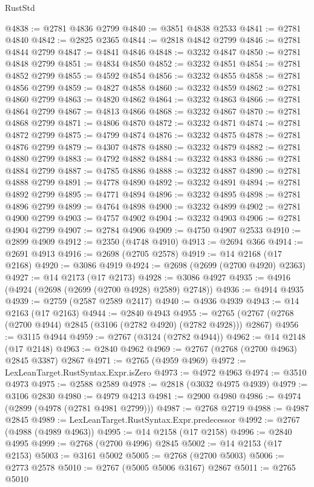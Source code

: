 \begin{lexlean}{RustStd}
\begin{coremodule}
@4838 := @2781 @4836 @2799
@4840 := @3851 @4838 @2533
@4841 := @2781 @4840
@4842 := @2825 @2365
@4844 := @2818 @4842 @2799
@4846 := @2781 @4844 @2799
@4847 := @4841 @4846
@4848 := @3232 @4847
@4850 := @2781 @4848 @2799
@4851 := @4834 @4850
@4852 := @3232 @4851
@4854 := @2781 @4852 @2799
@4855 := @4592 @4854
@4856 := @3232 @4855
@4858 := @2781 @4856 @2799
@4859 := @4827 @4858
@4860 := @3232 @4859
@4862 := @2781 @4860 @2799
@4863 := @4820 @4862
@4864 := @3232 @4863
@4866 := @2781 @4864 @2799
@4867 := @4813 @4866
@4868 := @3232 @4867
@4870 := @2781 @4868 @2799
@4871 := @4806 @4870
@4872 := @3232 @4871
@4874 := @2781 @4872 @2799
@4875 := @4799 @4874
@4876 := @3232 @4875
@4878 := @2781 @4876 @2799
@4879 := @4307 @4878
@4880 := @3232 @4879
@4882 := @2781 @4880 @2799
@4883 := @4792 @4882
@4884 := @3232 @4883
@4886 := @2781 @4884 @2799
@4887 := @4785 @4886
@4888 := @3232 @4887
@4890 := @2781 @4888 @2799
@4891 := @4778 @4890
@4892 := @3232 @4891
@4894 := @2781 @4892 @2799
@4895 := @4771 @4894
@4896 := @3232 @4895
@4898 := @2781 @4896 @2799
@4899 := @4764 @4898
@4900 := @3232 @4899
@4902 := @2781 @4900 @2799
@4903 := @4757 @4902
@4904 := @3232 @4903
@4906 := @2781 @4904 @2799
@4907 := @2784 @4906
@4909 := @4750 @4907 @2533
@4910 := @2899 @4909
@4912 := @2350 (@4748 @4910)
@4913 := @2694 @366
@4914 := @2691 @4913
@4916 := @2698 (@2705 @2578)
@4919 := @14 @2168 (@17 @2168)
@4920 := @3086 @4919
@4924 := @2698 (@2699 (@2700 @4920) @2363)
@4927 := @14 @2173 (@17 @2173)
@4928 := @3086 @4927
@4935 := @4916 (@4924 (@2698 (@2699 (@2700 @4928) @2589) @2748))
@4936 := @4914 @4935
@4939 := @2759 (@2587 @2589 @2417)
@4940 := @4936 @4939
@4943 := @14 @2163 (@17 @2163)
@4944 := @2840 @4943
@4955 := @2765 (@2767 (@2768 (@2700 @4944) @2845 (@3106 (@2782 @4920) (@2782 @4928))) @2867)
@4956 := @3115 @4944
@4959 := @2767 (@3124 (@2782 @4944))
@4962 := @14 @2148 (@17 @2148)
@4963 := @2840 @4962
@4969 := @2767 (@2768 (@2700 @4963) @2845 @3387) @2867
@4971 := @2765 (@4959 @4969)
@4972 := LexLeanTarget.RustSyntax.Expr.isZero
@4973 := @4972 @4963
@4974 := @3510 @4973
@4975 := @2588 @2589
@4978 := @2818 (@3032 @4975 @4939)
@4979 := @3106 @2830
@4980 := @4979 @4213
@4981 := @2900 @4980
@4986 := @4974 (@2899 (@4978 (@2781 @4981 @2799)))
@4987 := @2768 @2719
@4988 := @4987 @2845
@4989 := LexLeanTarget.RustSyntax.Expr.predecessor
@4992 := @2767 (@4988 (@4989 @4963))
@4995 := @14 @2158 (@17 @2158)
@4996 := @2840 @4995
@4999 := @2768 (@2700 @4996) @2845
@5002 := @14 @2153 (@17 @2153)
@5003 := @3161 @5002
@5005 := @2768 (@2700 @5003)
@5006 := @2773 @2578
@5010 := @2767 (@5005 @5006 @3167) @2867
@5011 := @2765 @5010

\end{coremodule}
\end{lexlean}
